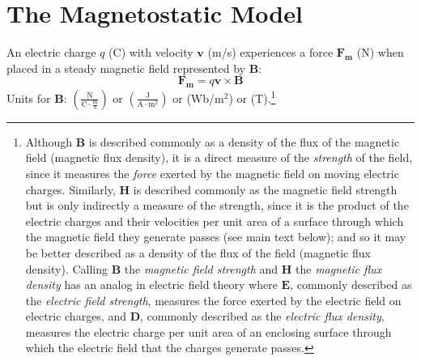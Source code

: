 \section{The Magnetostatic Model}\label{sec:magnetostatics}
An electric charge $q$ (C) with velocity $\mathbf{v}$ (m/s) experiences a force $\mathbf{F_m}$ (N) when placed in a steady magnetic field represented by $\mathbf{B}$:
\begin{equation}\label{F_m}
\mathbf{F_m} = q \mathbf{v} \times \mathbf{B}
\end{equation}
Units for $\mathbf{B}$: $\left( \frac{\mathrm{N}}{\mathrm{C} \cdot \frac{\mathrm{m}}{\mathrm{s}}} \right)$ or $\left( \frac{\mathrm{J}}{\mathrm{A} \cdot \mathrm{m^2}} \right)$ or (Wb/m$^2$) or (T).\footnote{Although $\mathbf{B}$ is described commonly as a density of the flux of the magnetic field (magnetic flux density), it is a direct measure of the \emph{strength} of the field, since it measures the \emph{force} exerted by the magnetic field on moving electric charges.  Similarly, $\mathbf{H}$ is described commonly as the magnetic field strength but is only indirectly a measure of the strength, since it is the product of the electric charges and their velocities per unit area of a surface through which the magnetic field they generate passes (see main text below); and so it may be better described as a density of the flux of the field (magnetic flux density).  Calling $\mathbf{B}$ the \emph{magnetic field strength} and $\mathbf{H}$ the \emph{magnetic flux density} has an analog in electric field theory 
where $\mathbf{E}$, commonly described as the \emph{electric field strength}, measures the force exerted by the electric field on electric charges, and $\mathbf{D}$, commonly described as the \emph{electric flux density}, measures the electric charge per unit area of an enclosing surface through which the electric field that the charges generate passes.%
}


